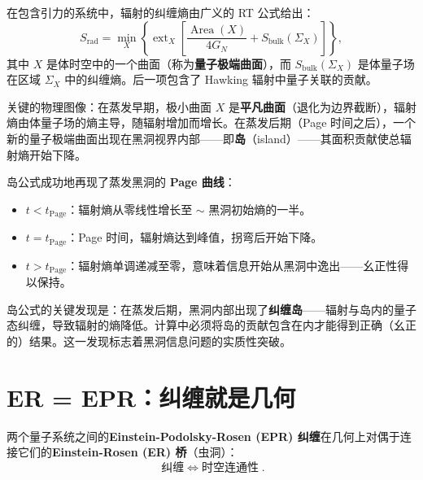 \begin{theorem}
    在包含引力的系统中，辐射的纠缠熵由广义的 RT 公式给出：
    \begin{equation}
        \boxed{S_{\text{rad}} = \min_X \left\{\operatorname{ext}_X\left[\frac{\operatorname{Area}(X)}{4G_N} + S_{\text{bulk}}(\Sigma_X)\right]\right\}},
    \end{equation}
    其中 $X$ 是体时空中的一个曲面（称为\textbf{量子极端曲面}），而 $S_{\text{bulk}}(\Sigma_X)$ 是体量子场在区域 $\Sigma_X$ 中的纠缠熵。后一项包含了 Hawking 辐射中量子关联的贡献。

    关键的物理图像：在蒸发早期，极小曲面 $X$ 是\textbf{平凡曲面}（退化为边界截断），辐射熵由体量子场的熵主导，随辐射增加而增长。在蒸发后期（Page 时间之后），一个新的量子极端曲面出现在黑洞视界内部——即\textbf{岛}（island）——其面积贡献使总辐射熵开始下降。
\end{theorem}

\begin{remark}
    岛公式成功地再现了蒸发黑洞的 \textbf{Page 曲线}：
    \begin{itemize}
        \item $t < t_{\text{Page}}$：辐射熵从零线性增长至 $\sim$ 黑洞初始熵的一半。
        \item $t = t_{\text{Page}}$：Page 时间，辐射熵达到峰值，拐弯后开始下降。
        \item $t > t_{\text{Page}}$：辐射熵单调递减至零，意味着信息开始从黑洞中逸出——幺正性得以保持。
    \end{itemize}
    岛公式的关键发现是：在蒸发后期，黑洞内部出现了\textbf{纠缠岛}——辐射与岛内的量子态纠缠，导致辐射的熵降低。计算中必须将岛的贡献包含在内才能得到正确（幺正的）结果。这一发现标志着黑洞信息问题的实质性突破。
\end{remark}

\section{ER = EPR：纠缠就是几何}

\begin{theorem}[ER = EPR 猜想（Maldacena \& Susskind, 2013）]
    两个量子系统之间的\textbf{Einstein-Podolsky-Rosen (EPR) 纠缠}在几何上对偶于连接它们的\textbf{Einstein-Rosen (ER) 桥}（虫洞）：
    \begin{equation}
        \boxed{\text{纠缠} \;\Longleftrightarrow\; \text{时空连通性}}.
    \end{equation}
\end{theorem}

